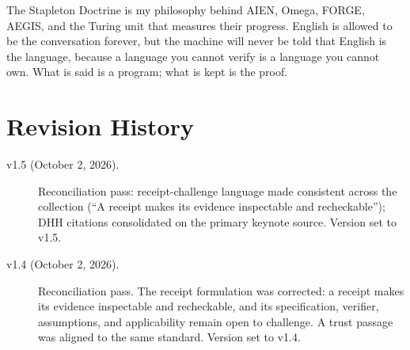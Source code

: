 \documentclass[11pt]{article}
\begin{document}
The Stapleton Doctrine is my philosophy behind AIEN, Omega, FORGE,
AEGIS, and the Turing unit that measures their progress. English is
allowed to be the conversation forever, but the machine will never
be told that English is the language, because a language you cannot
verify is a language you cannot own. What is said is a program;
what is kept is the proof.

\section*{Revision History}

\begin{description}
\item[v1.5 (October 2, 2026).] Reconciliation pass: receipt-challenge
language made consistent across the collection (``A receipt makes its
evidence inspectable and recheckable''); DHH citations consolidated
on the primary keynote source. Version set to v1.5.
\item[v1.4 (October 2, 2026).] Reconciliation pass. The receipt
formulation was corrected: a receipt makes its evidence inspectable
and recheckable, and its specification, verifier, assumptions, and
applicability remain open to challenge. A trust passage was aligned
to the same standard. Version set to v1.4.
\end{description}
\end{document}
